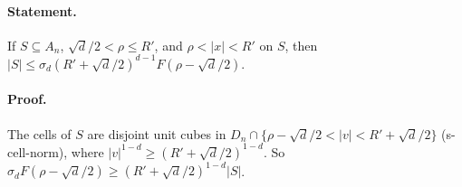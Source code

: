 \paragraph{Statement.} If $S\subseteq A_n$, $\sqrt d/2<\rho\leq R'$, and $\rho<|x|<R'$ on $S$, then $|S|\leq\sigma_d(R'+\sqrt d/2)^{d-1}F(\rho-\sqrt d/2)$.
\paragraph{Proof.} The cells of $S$ are disjoint unit cubes in $D_n\cap\{\rho-\sqrt d/2<|v|<R'+\sqrt d/2\}$ (s-cell-norm), where
$|v|^{1-d}\geq(R'+\sqrt d/2)^{1-d}$. So $\sigma_dF(\rho-\sqrt d/2)\geq(R'+\sqrt d/2)^{1-d}|S|$.
